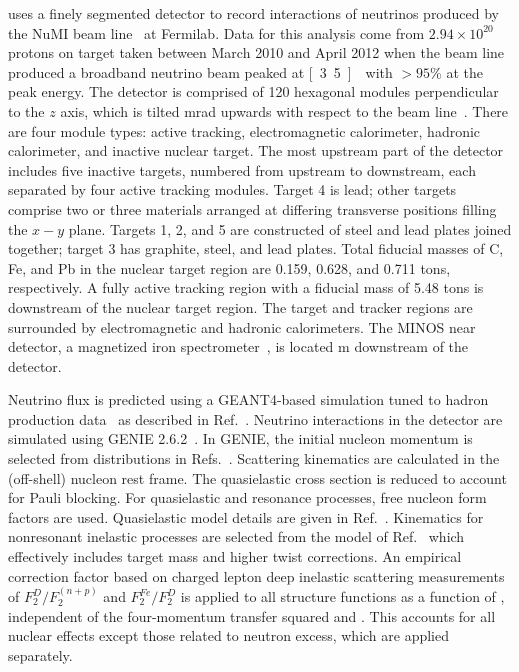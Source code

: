 
\minerva uses a finely segmented detector to record interactions of neutrinos produced by the NuMI beam line~\cite{Anderson:1998zza} at Fermilab.  
Data for this analysis come from $2.94\times 10^{20}$ protons on target taken between March 2010 and April 2012 
when the beam line produced a broadband neutrino beam peaked at \unit[3.5]{\GeV} with $>95\%$ \numu at the peak energy.
The \minerva detector is comprised of 120 hexagonal modules 
perpendicular to the $z$ axis, which is tilted \unit[58]{mrad} upwards with respect to the beam line~\cite{minerva_nim}.
There are four module types: active tracking, 
electromagnetic calorimeter, hadronic calorimeter, and inactive nuclear target.
The most upstream part of
the detector includes five inactive targets, numbered from upstream to downstream, 
each separated by four active tracking modules.
Target 4 is lead; other targets comprise two or three materials arranged at differing transverse positions filling the $x-y$ plane.
Targets 1, 2, and 5 are constructed of steel and lead plates joined together;
target 3 has graphite, steel, and lead plates.  
Total fiducial masses of C, Fe, and Pb in the nuclear target region 
are 0.159, 0.628, and 0.711 tons, respectively.
A fully active tracking region with a fiducial mass of 5.48 tons is downstream of the nuclear target region.
The target and tracker regions are surrounded by electromagnetic and hadronic calorimeters.
The MINOS near detector, a magnetized iron spectrometer~\cite{Michael:2008bc}, is located 
\unit[2]{m} downstream of the \minerva detector.

Neutrino flux is predicted using a GEANT4-based simulation tuned to hadron production data~\cite{Alt:2006fr} as described in Ref.~\cite{nubarprl}.
Neutrino interactions in the detector are simulated using GENIE 2.6.2~\cite{Andreopoulos201087}. 
In GENIE, the initial nucleon momentum is selected from distributions in Refs.~\cite{Bodek:1980ar,Bodek:1981wr}.   
Scattering kinematics are calculated in the (off-shell) nucleon rest frame.    
The quasielastic cross section is reduced to account for Pauli blocking.    
For quasielastic and resonance processes, free nucleon form factors are used.  
Quasielastic model details are given in Ref.~\cite{nubarprl}. 
Kinematics for nonresonant inelastic processes are selected from the model of Ref.~\cite{Bodek:2004pc}
which effectively includes target mass and higher twist corrections. 
An empirical correction factor based on charged lepton deep inelastic scattering measurements of 
$F_{2}^{D}/F_2^{\left(n+p\right)}$ and $F_{2}^{Fe}/F_{2}^{D}$ is applied to all structure functions 
as a function of \Xbj, independent of the four-momentum transfer squared \Qsq and \A.  
This accounts for all nuclear effects except those related to neutron excess, which are applied separately.

